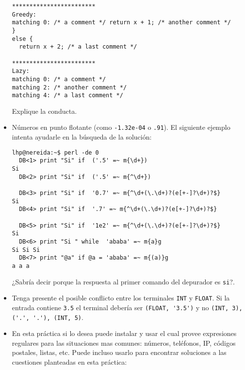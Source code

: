\begin{itemize}
\begin{verbatim}
************************
Greedy:
matching 0: /* a comment */ return x + 1; /* another comment */
}
else {
  return x + 2; /* a last comment */

************************
Lazy:
matching 0: /* a comment */
matching 2: /* another comment */
matching 4: /* a last comment */
\end{verbatim}

Explique la conducta.

%

\item
Números en punto flotante (como \verb|-1.32e-04| o \verb|.91|).
El siguiente ejemplo intenta ayudarle en la búsqueda de la solución:
\begin{verbatim}
lhp@nereida:~$ perl -de 0
  DB<1> print "Si" if  ('.5' =~ m{\d+})
Si
  DB<2> print "Si" if  ('.5' =~ m{^\d+})

  DB<3> print "Si" if  '0.7' =~ m{^\d+(\.\d+)?(e[+-]?\d+)?$}
Si
  DB<4> print "Si" if  '.7' =~ m{^\d+(\.\d+)?(e[+-]?\d+)?$}

  DB<5> print "Si" if  '1e2' =~ m{^\d+(\.\d+)?(e[+-]?\d+)?$}
Si
  DB<6> print "Si " while  'ababa' =~ m{a}g
Si Si Si
  DB<7> print "@a" if @a = 'ababa' =~ m{(a)}g
a a a
\end{verbatim}
¿Sabría decir porque la respuesta al primer comando del depurador es
\verb|si|?.

\item
Tenga presente el posible conflicto entre los terminales \verb|INT| y \verb|FLOAT|.
Si la entrada contiene \verb|3.5| el terminal debería ser \verb|(FLOAT, '3.5')|
y no \verb|(INT, 3), ('.', '.'), (INT, 5)|.

\item
En esta práctica si lo desea puede instalar y usar 
 el cual provee expresiones regulares para las situaciones mas comunes: números, 
teléfonos, IP, códigos postales, listas, etc. Puede incluso usarlo para encontrar 
soluciones a las cuestiones planteadas en esta práctica:


\end{itemize}
